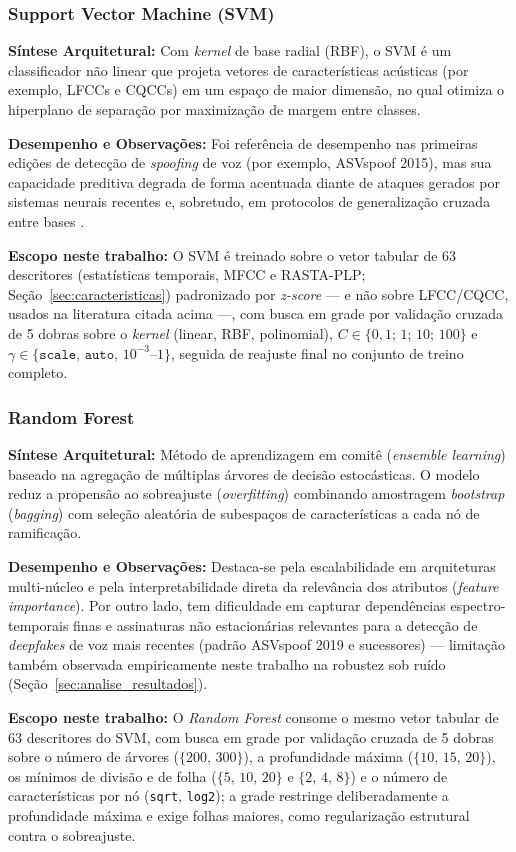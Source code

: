 \documentclass[12pt,a4paper]{article}
\begin{document}
\subsubsection*{Support Vector Machine (SVM) \cite{cortes1995support}}
\textbf{Síntese Arquitetural:} Com \textit{kernel} de base radial (RBF), o SVM é um classificador não linear que projeta vetores de características acústicas (por exemplo, LFCCs e CQCCs) em um espaço de maior dimensão, no qual otimiza o hiperplano de separação por maximização de margem entre classes.
\par\textbf{Desempenho e Observações:} Foi referência de desempenho nas primeiras edições de detecção de \textit{spoofing} de voz (por exemplo, ASVspoof 2015), mas sua capacidade preditiva degrada de forma acentuada diante de ataques gerados por sistemas neurais recentes e, sobretudo, em protocolos de generalização cruzada entre bases \cite{muller2022does}.
\par\textbf{Escopo neste trabalho:} O SVM é treinado sobre o vetor tabular de \num{63} descritores (estatísticas temporais, MFCC e RASTA-PLP; Seção~\ref{sec:caracteristicas}) padronizado por \textit{z-score} --- e não sobre LFCC/CQCC, usados na literatura citada acima ---, com busca em grade por validação cruzada de \num{5} dobras sobre o \textit{kernel} (linear, RBF, polinomial), $C \in \{0{,}1;\, 1;\, 10;\, 100\}$ e $\gamma \in \{\texttt{scale},\, \texttt{auto},\, 10^{-3}\text{--}1\}$, seguida de reajuste final no conjunto de treino completo.

\subsubsection*{Random Forest \cite{breiman2001random}}
\textbf{Síntese Arquitetural:} Método de aprendizagem em comitê (\textit{ensemble learning}) baseado na agregação de múltiplas árvores de decisão estocásticas. O modelo reduz a propensão ao sobreajuste (\textit{overfitting}) combinando amostragem \textit{bootstrap} (\textit{bagging}) com seleção aleatória de subespaços de características a cada nó de ramificação.
\par\textbf{Desempenho e Observações:} Destaca-se pela escalabilidade em arquiteturas multi-núcleo e pela interpretabilidade direta da relevância dos atributos (\textit{feature importance}). Por outro lado, tem dificuldade em capturar dependências espectro-temporais finas e assinaturas não estacionárias relevantes para a detecção de \textit{deepfakes} de voz mais recentes (padrão ASVspoof 2019 e sucessores) --- limitação também observada empiricamente neste trabalho na robustez sob ruído (Seção~\ref{sec:analise_resultados}).
\par\textbf{Escopo neste trabalho:} O \textit{Random Forest} consome o mesmo vetor tabular de \num{63} descritores do SVM, com busca em grade por validação cruzada de \num{5} dobras sobre o número de árvores ($\{200,\, 300\}$), a profundidade máxima ($\{10,\, 15,\, 20\}$), os mínimos de divisão e de folha ($\{5,\, 10,\, 20\}$ e $\{2,\, 4,\, 8\}$) e o número de características por nó (\texttt{sqrt}, \texttt{log2}); a grade restringe deliberadamente a profundidade máxima e exige folhas maiores, como regularização estrutural contra o sobreajuste.
\end{document}
